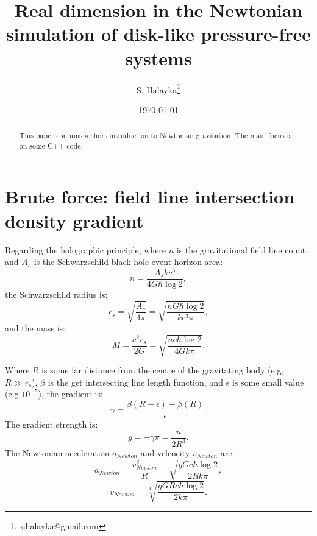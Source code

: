 \documentclass[12pt]{article}
\title{Real dimension in the Newtonian simulation of disk-like pressure-free systems}
\author{S. Halayka\footnote{sjhalayka@gmail.com}}
\date{\today\;\currenttime}
\begin{document}
 
\maketitle

\begin{abstract}
This paper contains a short introduction to Newtonian gravitation.
The main focus is on some C++ code.
\end{abstract}






\section{Brute force: field line intersection density gradient}
Regarding the holographic principle, where $n$ is the gravitational field line count, and $A_s$ is the Schwarzschild black hole event horizon area:
\begin{equation}
n = \frac{A_s k c^3}{ 4 G \hbar \log 2},
\end{equation}
the Schwarzschild radius is:
\begin{equation}
r_s = \sqrt{\frac{A_s}{4 \pi}} = \sqrt{\frac{n G \hbar \log 2}{k c^3 \pi}},
\end{equation}
and the mass is:
\begin{equation}
M = \frac{c^2 r_s}{2 G} = \sqrt{\frac{n c \hbar \log 2}{4 G k \pi}}. 
\end{equation}

Where $R$ is some far distance from the centre of the gravitating body (e.g, $R \gg r_s$), $\beta$ is the get intersecting line length function, and $\epsilon$ is some small value (e.g $10^{-5}$), the gradient is:
\begin{equation}
\gamma = \frac{\beta(R + \epsilon) - \beta(R)}{\epsilon}.
\end{equation}
The gradient strength is:
\begin{equation}
g = -\gamma \pi = \frac{n}{2 R^3}.
\end{equation}
The Newtonian acceleration $a_{\textit{Newton}}$ and velcocity $v_{\textit{Newton}}$ are:
\begin{equation}
a_{\textit{Newton}} = \frac{v_{\textit{Newton}}^2}{R} = \sqrt{\frac{g G c \hbar \log 2}{2 R k \pi}},
\end{equation}
\begin{equation}
v_{\textit{Newton}} = \sqrt[4]{\frac{g G R c \hbar \log 2}{2 k \pi}}.
\end{equation}
\end{document}
